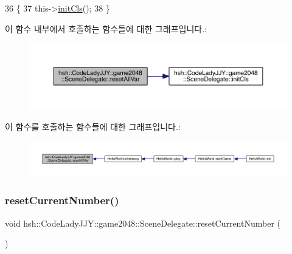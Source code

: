 \begin{DoxyCode}
36                                   \{
37                     this->\hyperlink{classhsh_1_1_code_lady_j_j_y_1_1game2048_1_1_scene_delegate_ab5504cff24fa2c916c0c6139aff67a4e}{initCls}();
38                 \}
\end{DoxyCode}
이 함수 내부에서 호출하는 함수들에 대한 그래프입니다.\+:
\nopagebreak
\begin{figure}[H]
\begin{center}
\leavevmode
\includegraphics[width=350pt]{d7/d4d/classhsh_1_1_code_lady_j_j_y_1_1game2048_1_1_scene_delegate_a07cb2b429428f54e4291c4c8dc63b4ac_cgraph}
\end{center}
\end{figure}
이 함수를 호출하는 함수들에 대한 그래프입니다.\+:
\nopagebreak
\begin{figure}[H]
\begin{center}
\leavevmode
\includegraphics[width=350pt]{d7/d4d/classhsh_1_1_code_lady_j_j_y_1_1game2048_1_1_scene_delegate_a07cb2b429428f54e4291c4c8dc63b4ac_icgraph}
\end{center}
\end{figure}
\mbox{\label{classhsh_1_1_code_lady_j_j_y_1_1game2048_1_1_scene_delegate_acc4d5baa06662db5472e7bdee6758fd9}} 
\subsubsection{\texorpdfstring{reset\+Current\+Number()}{resetCurrentNumber()}}
{\footnotesize\ttfamily void hsh\+::\+Code\+Lady\+J\+J\+Y\+::game2048\+::\+Scene\+Delegate\+::reset\+Current\+Number (\begin{DoxyParamCaption}{ }\end{DoxyParamCaption})\hspace{0.3cm}{\ttfamily [inline]}}



